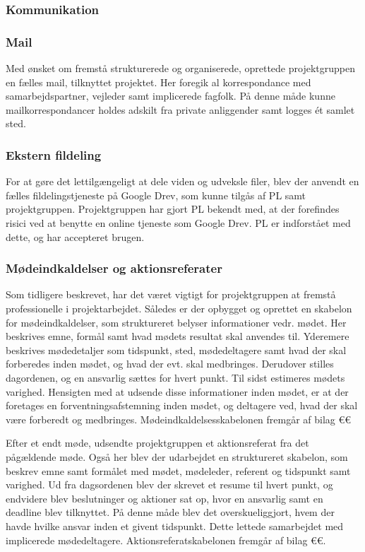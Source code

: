 \subsubsection{Kommunikation}

	\subsubsection{Mail}
	Med ønsket om fremstå strukturerede og organiserede, oprettede projektgruppen en fælles mail, tilknyttet projektet. Her foregik al korrespondance med samarbejdspartner, vejleder samt implicerede fagfolk. På denne måde kunne mailkorrespondancer holdes adskilt fra private anliggender samt logges ét samlet sted. 
	\subsubsection{Ekstern fildeling}
	For at gøre det lettilgængeligt at dele viden og udveksle filer, blev der anvendt en fælles fildelingstjeneste på Google Drev, som kunne tilgås af PL samt projektgruppen.  
	Projektgruppen har gjort PL bekendt med, at der forefindes risici ved at benytte en online tjeneste som Google Drev. PL er indforstået med dette, og har accepteret brugen. 
	\subsubsection{Mødeindkaldelser og aktionsreferater}
	Som tidligere beskrevet, har det været vigtigt for projektgruppen at fremstå professionelle i projektarbejdet. Således er der opbygget og oprettet en skabelon for mødeindkaldelser, som struktureret belyser informationer vedr. mødet. Her beskrives emne, formål samt hvad mødets resultat skal anvendes til. Yderemere beskrives mødedetaljer som tidspunkt, sted, mødedeltagere samt hvad der skal forberedes inden mødet, og hvad der evt. skal medbringes. Derudover stilles dagordenen, og en ansvarlig sættes for hvert punkt. Til sidst estimeres mødets varighed. Hensigten med at udsende disse informationer inden mødet, er at der foretages en forventningsafstemning inden mødet, og deltagere ved, hvad der skal være forberedt og medbringes. Mødeindkaldelsesskabelonen fremgår af bilag €€ 
	
	Efter et endt møde, udsendte projektgruppen et aktionsreferat fra det pågældende møde. Også her blev der udarbejdet en struktureret skabelon, som beskrev emne samt formålet med mødet, mødeleder, referent og tidspunkt samt varighed. Ud fra dagsordenen blev der skrevet et resume til hvert punkt, og endvidere blev beslutninger og aktioner sat op, hvor en ansvarlig samt en deadline blev tilknyttet. På denne måde blev det overskueliggjort, hvem der havde hvilke ansvar inden et givent tidspunkt. Dette lettede samarbejdet med implicerede mødedeltagere. Aktionsreferatskabelonen fremgår af bilag €€.     
	
